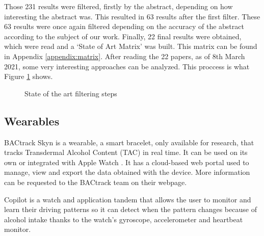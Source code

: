 Those 231 results were filtered, firstly by the abstract, depending on how interesting the abstract was. This resulted in 63 results after the first filter. These 63 results were once again filtered depending on the accuracy of the abstract according to the subject of our work. Finally,  22 final results were obtained, which were read and a ‘State of Art Matrix’ was built. This matrix can be found in Appendix \ref{appendix:matrix}. After reading the 22 papers, as of 8th March 2021, some very interesting approaches can be analyzed. This proccess is what Figure \ref{proccess} shows.

\begin{figure}[H]
  \centering
  \caption{State of the art filtering steps}
  \label{proccess}
\end{figure}

\subsection{Wearables}

BACtrack Skyn \cite{bactrackskyn} is a wearable, a smart bracelet, only available for research, that tracks Transdermal Alcohol Content (TAC) in real time. It can be used on its own or integrated with Apple Watch \cite{applewatch}. It has a cloud-based web portal used to manage, view and export the data obtained with the device. More information can be requested to the BACtrack team on their webpage.

Copilot \cite{copiloto} is a watch and application tandem that allows the user to monitor and learn their driving patterns so it can detect when the pattern changes because of alcohol intake thanks to the watch’s gyroscope, accelerometer and heartbeat monitor.


